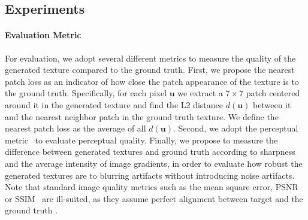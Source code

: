 \subsection{Experiments}

\paragraph*{Evaluation Metric}
For evaluation, we adopt several different metrics to measure the quality of the generated texture compared to the ground truth. 
First, we propose the nearest patch loss as an indicator of how close the patch appearance of the texture is to the ground truth. Specifically, for each pixel $\mathbf{u}$ we extract a $7\times 7$ patch centered around it in the generated texture and find the L2 distance $d(\mathbf{u})$ between it and the nearest neighbor patch in the ground truth texture. We define the nearest patch loss as the average of all $d(\mathbf{u})$.
Second, we adopt the perceptual metric~\cite{zhang2018unreasonable} to evaluate perceptual quality. 
Finally, we propose to measure the difference between generated textures and ground truth according to sharpness~\cite{vu2011bf} and the average intensity of image gradients, in order to evaluate how robust the generated textures are to blurring artifacts without introducing noise artifacts. 
Note that standard image quality metrics such as the mean square error, PSNR~\cite{de2003improved} or SSIM~\cite{brunet2011mathematical} are ill-suited, as they assume perfect alignment between target and the ground truth \cite{zhang2018unreasonable}.

